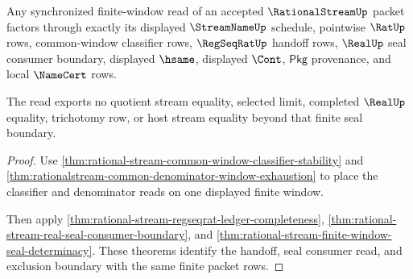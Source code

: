 \begin{theorem}\label{thm:rationalstream-synchronized-seal-readback-exhaustion}
Any synchronized finite-window read of an accepted $\RationalStreamUp$ packet
factors through exactly its displayed $\StreamNameUp$ schedule, pointwise $\RatUp$
rows, common-window classifier rows, $\RegSeqRatUp$ handoff rows, $\RealUp$ seal
consumer boundary, displayed $\hsame$, displayed $\Cont$, $\mathsf{Pkg}$
provenance, and local $\NameCert$ rows.

The read exports no quotient stream equality, selected limit, completed
$\RealUp$ equality, trichotomy row, or host stream equality beyond that finite
seal boundary.
\end{theorem}
\begin{proof}
Use \autoref{thm:rational-stream-common-window-classifier-stability} and
\autoref{thm:rationalstream-common-denominator-window-exhaustion} to place the
classifier and denominator reads on one displayed finite window.

Then apply \autoref{thm:rational-stream-regseqrat-ledger-completeness},
\autoref{thm:rational-stream-real-seal-consumer-boundary}, and
\autoref{thm:rational-stream-finite-window-seal-determinacy}. These theorems
identify the handoff, seal consumer read, and exclusion boundary with the same
finite packet rows.
\end{proof}


